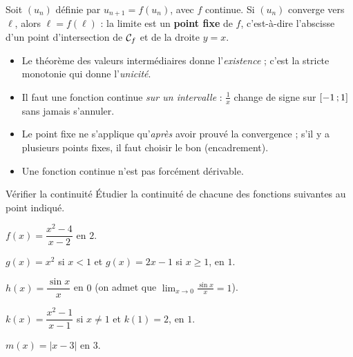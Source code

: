 \begin{theoreme}
Soit $(u_n)$ définie par $u_{n+1}=f(u_n)$, avec $f$ continue. Si $(u_n)$ converge vers $\ell$, alors $\ell=f(\ell)$ :
la limite est un \textbf{point fixe} de $f$, c'est-à-dire l'abscisse d'un point d'intersection de $\mathcal{C}_f$ et de la droite $y=x$.
\end{theoreme}

\begin{attention}
\begin{itemize}[label={\color{otOrange}\textbullet},leftmargin=1.4em,itemsep=0.6mm,topsep=0.5mm]
  \item Le théorème des valeurs intermédiaires donne l'\emph{existence} ; c'est la stricte monotonie qui donne l'\emph{unicité}.
  \item Il faut une fonction continue \emph{sur un intervalle} : $\frac1x$ change de signe sur $\mathopen{[}-1\,{;}\,1\mathclose{]}$ sans jamais s'annuler.
  \item Le point fixe ne s'applique qu'\emph{après} avoir prouvé la convergence ; s'il y a plusieurs points fixes, il faut choisir le bon (encadrement).
  \item Une fonction continue n'est pas forcément dérivable.
\end{itemize}
\end{attention}

\exercices
{}

\begin{exercice}[1]{Vérifier la continuité}
Étudier la continuité de chacune des fonctions suivantes au point indiqué.
\begin{questions}
  \item $f(x)=\dfrac{x^{2}-4}{x-2}$ en $2$.
  \item $g(x)=x^{2}$ si $x<1$ et $g(x)=2x-1$ si $x\geq1$, en $1$.
  \item $h(x)=\dfrac{\sin x}{x}$ en $0$ (on admet que $\displaystyle\lim_{x\to0}\frac{\sin x}{x}=1$).
  \item $k(x)=\dfrac{x^{2}-1}{x-1}$ si $x\neq1$ et $k(1)=2$, en $1$.
  \item $m(x)=|x-3|$ en $3$.
\end{questions}
\end{exercice}


